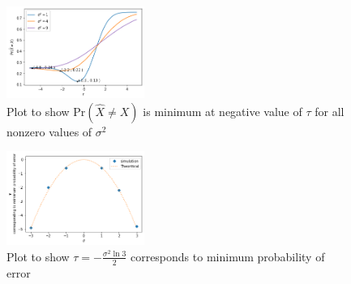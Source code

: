 \documentclass[journal,12pt,twocolumn]{IEEEtran}
\begin{document}
\newpage
\begin{figure}[h!]
    \centering
    \includegraphics[width=0.4\textwidth]{fig-errorVstau}
    \caption{Plot to show Pr$ \left( \hat{X} \neq X \right)$ is minimum at negative value of $\tau$ for all nonzero values of $\sigma^2$}
    \label{fig:errorVstau}
\end{figure}
\newpage
\begin{figure}[h!]
    \centering
    \includegraphics[width=0.4\textwidth]{fig-tauVssigma}
    \caption{Plot to show $\tau=-\frac{\sigma^2 \ln{3}}{2}$ corresponds to minimum probability of error}
    \label{fig:my_label}
\end{figure}
\end{document}
